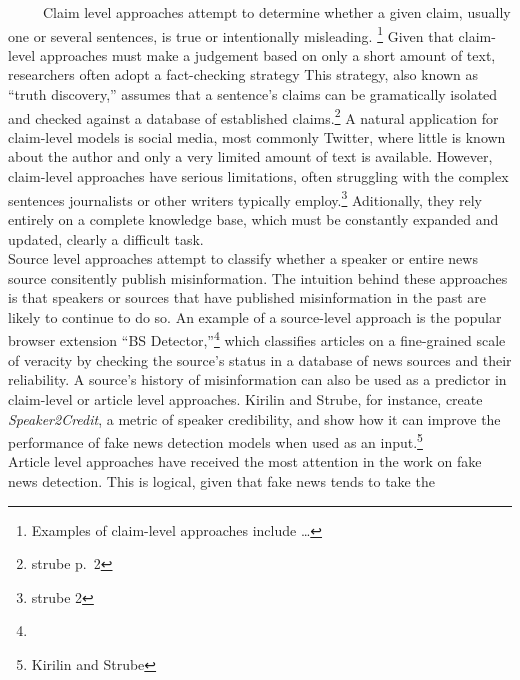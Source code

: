 \documentclass[12pt]{article}
\begin{document}
~~~~~Claim level approaches attempt to determine whether a given claim,
usually one or several sentences, is true or intentionally misleading.
\footnote{Examples of claim-level approaches include \ldots{}} Given
that claim-level approaches must make a judgement based on only a short
amount of text, researchers often adopt a fact-checking strategy This
strategy, also known as ``truth discovery,'' assumes that a sentence's
claims can be gramatically isolated and checked against a database of
established claims.\footnote{strube p.~2} A natural application for
claim-level models is social media, most commonly Twitter, where little
is known about the author and only a very limited amount of text is
available. However, claim-level approaches have serious limitations,
often struggling with the complex sentences journalists or other writers
typically employ.\footnote{strube 2} Aditionally, they rely entirely on
a complete knowledge base, which must be constantly expanded and
updated, clearly a difficult task.\\
\hspace*{0.333em}\hspace*{0.333em}\hspace*{0.333em}\hspace*{0.333em}\hspace*{0.333em}Source
level approaches attempt to classify whether a speaker or entire news
source consitently publish misinformation. The intuition behind these
approaches is that speakers or sources that have published
misinformation in the past are likely to continue to do so. An example
of a source-level approach is the popular browser extension ``BS
Detector,''\footnote{} which classifies articles on a fine-grained scale
of veracity by checking the source's status in a database of news
sources and their reliability. A source's history of misinformation can
also be used as a predictor in claim-level or article level approaches.
Kirilin and Strube, for instance, create \emph{Speaker2Credit}, a metric
of speaker credibility, and show how it can improve the performance of
fake news detection models when used as an input.\footnote{Kirilin and
  Strube}\\
\hspace*{0.333em}\hspace*{0.333em}\hspace*{0.333em}\hspace*{0.333em}\hspace*{0.333em}Article
level approaches have received the most attention in the work on fake
news detection. This is logical, given that fake news tends to take the
\end{document}
